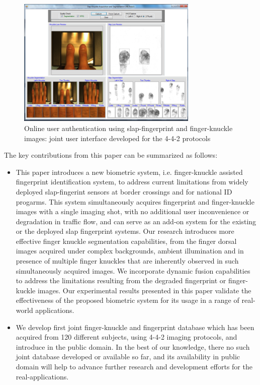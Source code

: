 \begin{figure}[!ht]
    \centering
    \includegraphics[width=3.4in]{Figures/system.png}
    \caption{Online user authentication using slap-fingerprint and finger-knuckle images: joint user interface developed for the 4-4-2 protocols }
    \label{system}
\end{figure}

The key contributions from this paper can be summarized as follows: 

\begin{itemize}
    \item This paper introduces a new biometric system, i.e. finger-knuckle assisted fingerprint identification system, to address current limitations from widely deployed slap-fingerint sensors at border crossings and for national ID progarms. This system simultaneously acquires fingerprint and finger-knuckle images with a single imaging shot, with no additional user inconvenience or degradation in traffic flow, and can serve as an add-on system for the existing or the deployed slap fingerprint systems. Our research introduces more effective finger knuckle segmentation capabilities, from the finger dorsal images acquired under complex backgrounds, ambient illumination and in presence of multiple finger knuckles that are inherently observed in such simultaneously acquired images. We incorporate dynamic fusion capabilities to address the limitations resulting from the degraded fingerprint or finger-kuckle images. Our experimental results presented in this paper validate the effectiveness of the proposed biometric system for its usage in a range of real-world applications. 
    \item We develop first joint finger-knuckle and fingerprint database which has been acquired from 120 different subjects, using 4-4-2 imaging protocols, and introduce in the public domain. In the best of our knowledge, there no such joint database developed or available so far, and its availability in public domain will help to advance further research and development efforts for the real-applications. 
\end{itemize}


